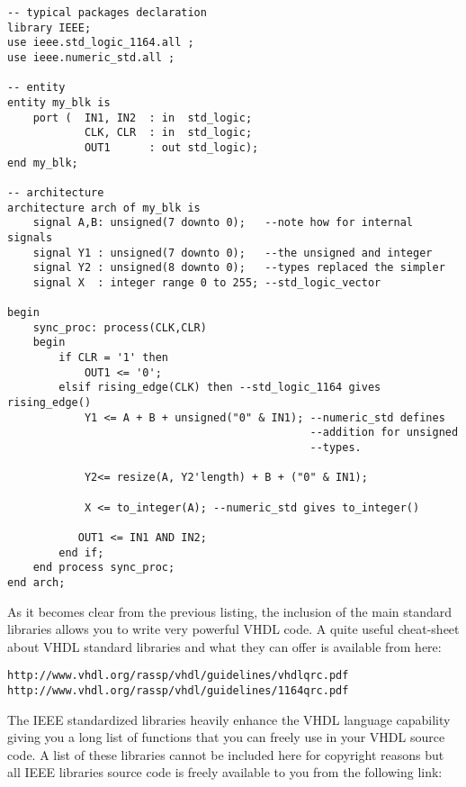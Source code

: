 \noindent
\begin{minipage}{0.99\linewidth}
\begin{lstlisting}[label=good_lib_ex, caption=Example of operators and types available with some IEEE packages.]
-- typical packages declaration
library IEEE;
use ieee.std_logic_1164.all ;
use ieee.numeric_std.all ;

-- entity
entity my_blk is
    port (  IN1, IN2  : in  std_logic;
            CLK, CLR  : in  std_logic;
            OUT1      : out std_logic);
end my_blk;

-- architecture
architecture arch of my_blk is
    signal A,B: unsigned(7 downto 0);   --note how for internal signals 
    signal Y1 : unsigned(7 downto 0);   --the unsigned and integer  
    signal Y2 : unsigned(8 downto 0);   --types replaced the simpler 
    signal X  : integer range 0 to 255; --std_logic_vector

begin
    sync_proc: process(CLK,CLR)
    begin
        if CLR = '1' then
            OUT1 <= '0';
        elsif rising_edge(CLK) then --std_logic_1164 gives rising_edge()
            Y1 <= A + B + unsigned("0" & IN1); --numeric_std defines
                                               --addition for unsigned
                                               --types.

            Y2<= resize(A, Y2'length) + B + ("0" & IN1);

            X <= to_integer(A); --numeric_std gives to_integer()

           OUT1 <= IN1 AND IN2;
        end if;
    end process sync_proc;
end arch;
\end{lstlisting}
\end{minipage}

As it becomes clear from the previous listing, the inclusion of the main standard libraries allows you to write very powerful VHDL code. A quite useful cheat-sheet about VHDL standard libraries and what they can offer is available from here:

\noindent
\begin{verbatim}
http://www.vhdl.org/rassp/vhdl/guidelines/vhdlqrc.pdf
http://www.vhdl.org/rassp/vhdl/guidelines/1164qrc.pdf
\end{verbatim}

The IEEE standardized libraries heavily enhance the VHDL language capability giving you a long list of functions that you can freely use in your VHDL source code. A list of these libraries cannot be included here for copyright reasons but all IEEE libraries source code is freely available to you from the following link:

